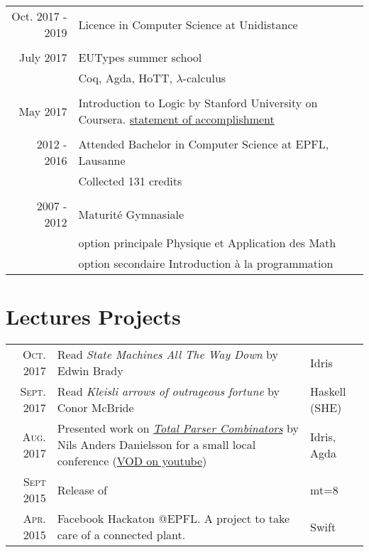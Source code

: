\documentclass[a4paper,10pt]{article} %
\begin{document}
\begin{tabular}{rl}	
Oct. 2017 - 2019 & Licence in Computer Science at Unidistance  \\\\ 

July 2017 & EUTypes summer school \\&\footnotesize{Coq, Agda, HoTT, $\lambda$-calculus} \\
\multicolumn{2}{c}{}\\
May 2017 & Introduction to Logic by Stanford University on Coursera. \footnotesize{\href{https://www.coursera.org/account/accomplishments/certificate/RPGEPLA94HFF}{statement of accomplishment}}\\
\multicolumn{2}{c}{}\\
2012 - 2016 & Attended Bachelor in Computer Science at EPFL, Lausanne\\
& \footnotesize{Collected 131 credits}\\
\multicolumn{2}{c}{}\\


2007 - 2012 & Maturité Gymnasiale\\ & option principale Physique et Application des Math\\ & option secondaire Introduction à la programmation\\
\end{tabular}


\section{Lectures Projects}
\renewcommand{\arraystretch}{1.5}
\begin{tabular}{rp{10cm}|l}
\textsc{Oct.} 2017 & Read \emph{State Machines All The Way Down} by Edwin Brady & Idris\\
\textsc{Sept.} 2017 & Read \emph{Kleisli arrows of outrageous fortune} by Conor McBride & Haskell (SHE)\\
\textsc{Aug.} 2017 & Presented work on \href{http://www.cse.chalmers.se/~nad/publications/danielsson-parser-combinators.html}{\emph{Total Parser Combinators}} by Nils Anders Danielsson for a small local conference (\href{https://www.youtube.com/watch?v=DzKVm6ApKFI}{VOD on youtube})& Idris, Agda\\
\textsc{Sept 2015} & Release of \href{https://itunes.apple.com/us/app/hackerspaces/id1035583993?ls=1&mt=8}{Hackerspaces} for iOS &\\
\textsc{Apr.} 2015 & Facebook Hackaton @EPFL. A project to take care of a connected plant. & Swift\\

\end{tabular}
\renewcommand{\arraystretch}{1.2}
\end{document}

